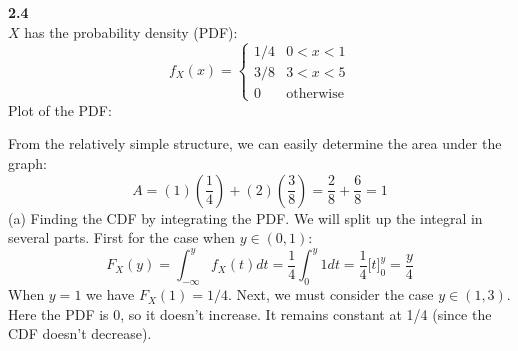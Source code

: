 \bigskip\noindent
\textbf{2.4}\\  %
$X$ has the probability density (PDF):
$$
f_X(x) = 
\left\{
    \begin{matrix}
        1/4 & 0<x<1 \\
        3/8 & 3<x<5 \\
        0 & \text{otherwise}
    \end{matrix}
\right.
$$
Plot of the PDF:
\begin{center}
\end{center}
From the relatively simple structure, we can easily determine the area under the graph:
$$
A = (1)\left(\frac{1}{4}\right) + (2)\left(\frac{3}{8}\right) = \frac{2}{8} + \frac{6}{8} = 1
$$
(a) Finding the CDF by integrating the PDF. We will split up the integral in several parts.
First for the case when $y\in(0,1)$:
$$
F_X(y) = \int_{-\infty}^y f_X(t)dt = \frac{1}{4}\int_0^y 1dt  
= \frac{1}{4}\Big[t\Big]_0^y 
= \frac{y}{4}
$$
When $y=1$ we have $F_X(1) = 1/4$.
Next, we must consider the case $y\in(1,3)$. Here the PDF is 0, so it doesn't increase.
It remains constant at 1/4 (since the CDF doesn't decrease).
